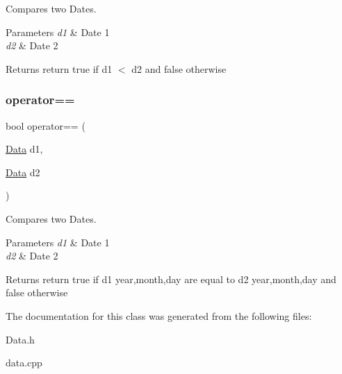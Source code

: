 Compares two Dates. 


\begin{DoxyParams}{Parameters}
{\em d1} & Date 1 \\
\hline
{\em d2} & Date 2\\
\hline
\end{DoxyParams}
\begin{DoxyReturn}{Returns}
return true if d1 $<$ d2 and false otherwise 
\end{DoxyReturn}
\mbox{\label{class_data_a580d7cc8a5888c50dc3bbe6408305197}} 
\subsubsection{\texorpdfstring{operator==}{operator==}}
{\footnotesize\ttfamily bool operator== (\begin{DoxyParamCaption}\item[{\hyperlink{class_data}{Data}}]{d1,  }\item[{\hyperlink{class_data}{Data}}]{d2 }\end{DoxyParamCaption})\hspace{0.3cm}{\ttfamily [friend]}}



Compares two Dates. 


\begin{DoxyParams}{Parameters}
{\em d1} & Date 1 \\
\hline
{\em d2} & Date 2\\
\hline
\end{DoxyParams}
\begin{DoxyReturn}{Returns}
return true if d1 year,month,day are equal to d2 year,month,day and false otherwise 
\end{DoxyReturn}


The documentation for this class was generated from the following files\+:\begin{DoxyCompactItemize}
\item 
Data.\+h\item 
data.\+cpp\end{DoxyCompactItemize}
